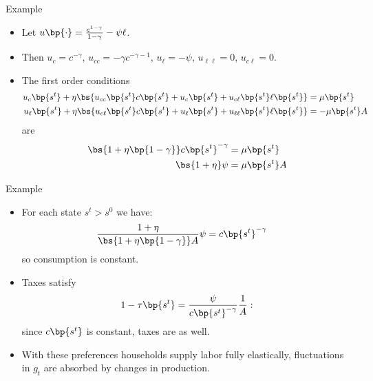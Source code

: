 \documentclass[11pt,xcolor={dvipsnames},hyperref={pdftex,pdfpagemode=UseNone,hidelinks,pdfdisplaydoctitle=true},usepdftitle=false]{beamer}
\begin{document}
    \begin{frame}{Example}
        \begin{itemize}
        \item Let $u\bp{\cdot} = \frac{c^{1-\gamma}}{1-\gamma} - \psi \ell $.
        \item Then $u_c = c^{-\gamma}$, $u_{cc} = -\gamma c^{-\gamma-1}$, $u_{\ell} = -\psi$, $u_{\ell\ell} = 0$, $u_{c\ell} = 0$.
        \item The first order conditions 
      \begin{align*}
            u_c\bp{s^t}  + \eta \bs{ u_{cc} \bp{s^t} c\bp{s^t} + u_c \bp{s^t} + u_{c\ell} \bp{s^t} \ell\bp{s^t} } & =  \mu \bp{s^t} \\
            u_\ell\bp{s^t}  + \eta \bs{ u_{c\ell} \bp{s^t} c\bp{s^t} + u_\ell \bp{s^t} + u_{\ell\ell} \bp{s^t} \ell\bp{s^t} } & =  - \mu \bp{s^t} A
          \end{align*}
          are
          \begin{align*}
            \bs{1+\eta\bp{1-\gamma}} c\bp{s^t}^{-\gamma} & =  \mu \bp{s^t} \\
            \bs{1+\eta}\psi & =   \mu \bp{s^t} A
          \end{align*}
            
        \end{itemize}
    \end{frame}

    \begin{frame}{Example}
        \begin{itemize}
        \item For each state $s^t>s^0$ we have:
        \begin{align*}
            \frac{1+\eta}{\bs{1+\eta\bp{1-\gamma}}A}\psi & =   c\bp{s^t}^{-\gamma}
        \end{align*}
        so consumption is constant.
        \item Taxes satisfy  
        \begin{align*}
        1-\tau\bp{s^t}  =  \frac{\psi}{c\bp{s^t}^{-\gamma}} \frac{1}{A}:
        \end{align*}
        since $c\bp{s^t}$ is constant, taxes are  as well.
        \item With these preferences households supply labor fully elastically, fluctuations in $g_t$ are absorbed by changes in production.
        \end{itemize}
    \end{frame}
    
\end{document}
